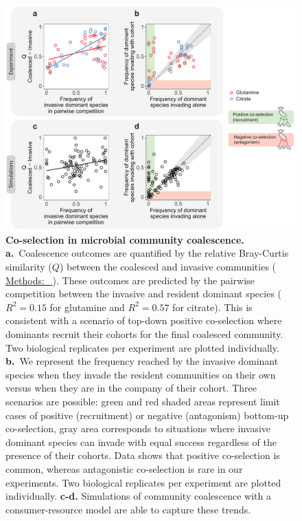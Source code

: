 \documentclass[a4paper,10pt]{article}
\newcommand{\methodsref}[1]{%
  \hyperref[{#1}]{%
   Methods:~\nameref*{#1}%
  }%
}
\begin{document}
\clearpage

\begin{figure}[!h]
\centering
\internallinenumbers
\includegraphics[width=15cm,keepaspectratio]{figs/fig2.pdf}
\caption{\textbf{Co-selection in microbial community coalescence.}
\textbf{a.}~Coalescence outcomes are quantified by the relative Bray-Curtis similarity
($Q$) between the coalesced and invasive communities (\methodsref{methods:metrics}).
These outcomes are predicted by the pairwise competition between the invasive and
resident dominant
species ($R^2=0.15$ for glutamine and $R^2=0.57$ for citrate). This is consistent with a scenario of
top-down positive co-selection where dominants recruit their cohorts for the final
coalesced community. Two biological replicates per experiment are plotted individually.
\textbf{b.}~We represent the frequency reached by
the invasive dominant species when they invade the resident communities on their own versus
when they are in the company of their cohort.
Three scenarios are possible: green and red
shaded areas represent limit cases of positive (recruitment) or negative (antagonism)
bottom-up co-selection, gray area corresponds to situations where invasive dominant
species can invade with equal success regardless of the presence of their cohorts.
Data shows that positive co-selection is common, whereas antagonistic
co-selection is rare in our experiments.
Two biological replicates per experiment are plotted individually.
\textbf{c-d.} Simulations of community coalescence with a consumer-resource model
are able to capture these trends.}
\label{fig2}
\end{figure}
\end{document}
